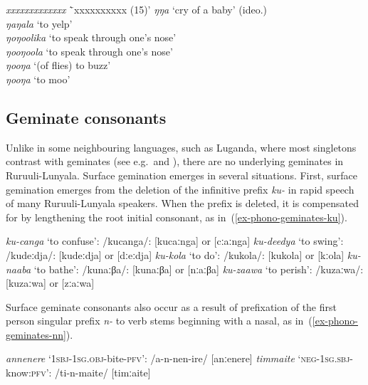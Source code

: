 \ea \label{ex-phono-ŋ-ideo}
\begin{tabbing}
	 \textit{xxxxxxxxxxxxx}  \=`xxxxxxxxxx (15)'\kill	
	 \textit{ŋŋa} \> `cry of a baby' (ideo.)\\
	 \textit{ŋaŋala}  \> `to yelp'\\
	 \textit{ŋoŋoolika}  \> `to speak through one's nose'\\
	 \textit{ŋooŋoola}  \> `to speak through one's nose'\\
	 \textit{ŋooŋa}   \>`(of flies) to buzz'\\
	 \textit{ŋooŋa}  \>`to moo'
\end{tabbing}	
\z
 
\subsection{Geminate consonants}\label{sec-phonology-geminate}
Unlike in some neighbouring languages, such as Luganda, where most singletons contrast with geminates (see e.g.\,\citealt{Ashtonetal1954Luganda} and \citealt{Hymanetal1999Syllable}), there are no underlying geminates in Ru\-ruu\-li\hyp{}Lu\-nya\-la.  
Surface gemination emerges in several situations. 
First, surface gemination emerges from the deletion of the infinitive prefix  \textit{ku- } in rapid speech of many Ru\-ruu\-li\hyp{}Lu\-nya\-la speakers. 
When the prefix is deleted, it is compensated for by lengthening the root initial consonant, as in~(\ref{ex-phono-geminates-ku}).
 
\ea \label{ex-phono-geminates-ku}
\begin{xlist}	
	\ex  \textit{ku-canga} `to confuse': /kucanga/:  [kucaːnga] or [cːaːnga]
	\ex  \textit{ku-deedya} `to swing': /kudeːdja/:  [kudeːdja] or [dːeːdja]
	\ex  \textit{ku-kola} `to do': /kukola/:  [kukola] or [kːola]
	\ex  \textit{ku-naaba} `to bathe': /kunaːβa/:  [kunaːβa] or [nːaːβa]
	\ex  \textit{ku-zaawa} `to perish': /kuzaːwa/:  [kuzaːwa] or [zːaːwa]
\end{xlist}	
\z

Surface geminate consonants also occur as a result of prefixation of the first person singular prefix  \textit{n-} to verb stems beginning with a nasal, as in~(\ref{ex-phono-geminates-nn}).

\ea \label{ex-phono-geminates-nn}
\begin{xlist}	
	\ex \label{ex-phono-geminates-nn-nounA}
	 \textit{annenere} `\textsc{1sbj}-\textsc{1sg.obj}-bite-\textsc{pfv}': /a-n-nen-ire/ [anːenere]
	\ex \label{ex-phono-geminates-nn-nounB}
	 \textit{timmaite} `\textsc{neg}-\textsc{1sg.sbj}-know:\textsc{pfv}': /ti-n-maite/ [timːaite]
\end{xlist}	
\z

